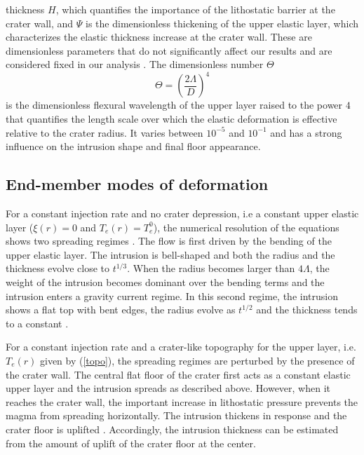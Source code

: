 thickness  $H$, which  quantifies  the importance  of the  lithostatic
barrier at the crater wall,  and $\Psi$ is the dimensionless thickening
of the upper elastic layer,  which characterizes the elastic thickness
increase at the crater wall.   These are dimensionless parameters that
do not  significantly affect our  results and are considered  fixed in
our analysis \citep{Thorey:2014cv}.  The dimensionless number $\Theta$
\begin{equation}
  \Theta=\left ( \frac{2\Lambda}{D} \right )^{4}\label{n5}
\end{equation}
is the dimensionless  flexural wavelength of the  upper layer raised
to  the power  $4$ that  quantifies the  length scale  over which  the
elastic deformation  is effective  relative to  the crater  radius. It
varies between $10^{-5}$  and $10^{-1}$ and has a  strong influence on
the intrusion shape and final floor appearance.

\subsection{End-member modes of deformation}
\label{sec:end-member-modes-1}

For a constant injection rate and no crater depression, i.e a constant
upper  elastic  layer ($\xi(r)  =  0  $  and  $T_e(r) =  T_e^0$),  the
numerical  resolution of  the  equations shows  two spreading  regimes
\citep{Michaut:2011kg,Michaut:2013dr}.   The flow  is first  driven by
the bending of the upper  elastic layer.  The intrusion is bell-shaped
and both the radius and the  thickness evolve close to $t^{1/3}$. When
the radius becomes larger than $4\Lambda$, the weight of the intrusion
becomes dominant  over the  bending terms and  the intrusion  enters a
gravity current regime.  In this  second regime, the intrusion shows a
flat  top with  bent edges,  the radius  evolve as  $t^{1/2}$ and  the
thickness tends to a constant \citep{Huppert:1982a,Michaut:2011kg}.
 
For a  constant injection  rate and a  crater-like topography  for the
upper  layer,  i.e.  $T_e(r)$  given  by  (\ref{topo}), the  spreading
regimes are perturbed by the presence of the crater wall.  The central
flat floor of the crater first  acts as a constant elastic upper layer
and the intrusion spreads as described above. However, when it reaches
the  crater  wall,  the  important increase  in  lithostatic  pressure
prevents  the  magma  from   spreading  horizontally.   The  intrusion
thickens   in   response   and    the   crater   floor   is   uplifted
\citep{Thorey:2014cv}.   Accordingly, the  intrusion thickness  can be
estimated from the amount of uplift of the crater floor at the center.


